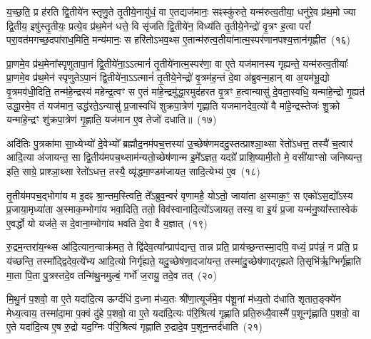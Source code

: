 य॒च्छ॒ति॒ प्र ह॑रति द्वि॒तीये॑न स्तृणु॒ते तृ॒तीये॒नायु॑धं॒ वा ए॒तद्यज॑मानः॒ सꣴस्कु॑रुते॒ यन्म॑रुत्व॒तीया॒ धनु॑रे॒व प्र॑थ॒मो ज्या द्वि॒तीय॒ इषु॑स्तृ॒तीयः॒ प्रत्ये॒व प्र॑थ॒मेन॑ धत्ते॒ वि सृ॑जति द्वि॒तीये॑न॒ विध्य॑ति तृ॒तीये॒नेन्द्रो॑ वृ॒त्रꣳ ह॒त्वा परां᳚ परा॒वत॑मगच्छ॒दपा॑राध॒मिति॒ मन्य॑मानः॒ स हरि॑तो\-ऽभव॒थ्स ए॒तान्म॑रुत्व॒तीया॑नात्म॒स्पर॑णानपश्य॒त्तान॑गृह्णीत~(१६)\ip

प्रा॒णमे॒व प्र॑थ॒मेना᳚स्पृणुतापा॒नं द्वि॒तीये॑ना॒\-ऽऽ\-त्मानं॑ तृ॒तीये॑नात्म॒स्पर॑णा॒ वा ए॒ते यज॑मानस्य गृह्यन्ते॒ यन्म॑रुत्व॒तीयाः᳚ प्रा॒णमे॒व प्र॑थ॒मेन॑ स्पृणुते\-ऽपा॒नं द्वि॒तीये॑ना॒\-ऽऽ\-त्मानं॑ तृ॒तीये॒नेन्द्रो॑ वृ॒त्रम॑ह॒न्तं दे॒वा अ॑ब्रुवन्म॒हान् वा अ॒यम॑भू॒द्यो वृ॒त्रमव॑धी॒दिति॒ तन्म॑हे॒न्द्रस्य॑ महेन्द्र॒त्वꣳ स ए॒तं मा॑हे॒न्द्रमु॑द्धा॒रमुद॑हरत वृ॒त्रꣳ ह॒त्वान्यासु॑ दे॒वता॒स्वधि॒ यन्मा॑हे॒न्द्रो गृ॒ह्यत॑ उद्धा॒रमे॒व तं यज॑मान॒ उद्ध॑रते॒\-ऽन्यासु॑ प्र॒जास्वधि॑ शुक्रपा॒त्रेण॑ गृह्णाति यजमानदेव॒त्यो॑ वै मा॑हे॒न्द्रस्तेजः॑ शु॒क्रो यन्मा॑हे॒न्द्रꣳ शु॑क्रपा॒त्रेण॑ गृ॒ह्णाति॒ यज॑मान ए॒व तेजो॑ दधाति॥~(१७)\ip

{\anuvakamend[{प्र॒थ॒मेना॑गृह्णीत दे॒वता᳚स्व॒ष्टाविꣳ॑शतिश्च}]}

अदि॑तिः पु॒त्रका॑मा सा॒ध्येभ्यो॑ दे॒वेभ्यो᳚ ब्रह्मौद॒नम॑पच॒त्तस्या॑ उ॒च्छेष॑णमददु॒स्तत्प्राश्ञा॒थ्सा रेतो॑\-ऽधत्त॒ तस्यै॑ च॒त्वार॑ आदि॒त्या अ॑जायन्त॒ सा द्वि॒तीय॑मपच॒थ्साम॑न्यतो॒च्छेष॑णान्म इ॒मे᳚\-ऽज्ञत॒ यदग्रे᳚ प्राशि॒ष्यामी॒तो मे॒ वसी॑याꣳसो जनिष्यन्त॒ इति॒ साग्रे॒ प्राश्ञा॒थ्सा रेतो॑\-ऽधत्त॒ तस्यै॒ व्यृ॑द्धमा॒ण्डम॑जायत॒ सादि॒त्येभ्य॑ ए॒व~(१८)\ip

तृ॒तीय॑मपच॒द्भोगा॑य म इ॒दꣴ श्रा॒न्तम॒स्त्विति॒ ते᳚\-ऽब्रुव॒न्वरं॑ वृणामहै॒ यो\-ऽतो॒ जाया॑ता अ॒स्माक॒ꣳ॒ स एको॑\-ऽस॒द्यो᳚\-ऽस्य प्र॒जाया॒मृध्या॑ता अ॒स्माक॒म्भोगा॑य भवा॒दिति॒ ततो॒ विव॑स्वानादि॒त्यो॑\-ऽजायत॒ तस्य॒ वा इ॒यं प्र॒जा यन्म॑नु॒ष्या᳚स्तास्वेक॑ ए॒वर्द्धो यो यज॑ते॒ स दे॒वाना॒म्भोगा॑य भवति दे॒वा वै य॒ज्ञात्~(१९)\ip

रु॒द्रम॒न्तरा॑य॒न्थ्स आ॑दि॒त्यान॒न्वाक्र॑मत॒ ते द्वि॑देव॒त्या᳚न्प्राप॑द्यन्त॒ तान्न प्रति॒ प्राय॑च्छ॒न्तस्मा॒दपि॒ वध्यं॒ प्रप॑न्नं॒ न प्रति॒ प्र य॑च्छन्ति॒ तस्मा᳚द्\-द्विदेव॒त्ये᳚भ्य आदि॒त्यो निर्गृ॑ह्यते॒ यदु॒च्छेष॑णा॒दजा॑यन्त॒ तस्मा॑दु॒च्छेष॑णाद्गृह्यते ति॒सृभि॑र्\mbox{}ऋ॒ग्भिर्गृ॑ह्णाति मा॒ता पि॒ता पु॒त्रस्तदे॒व तन्मि॑थु॒नमुल्बं॒ गर्भो॑ ज॒रायु॒ तदे॒व तत्~(२०)\ip

मि॒थु॒नं प॒शवो॒ वा ए॒ते यदा॑दि॒त्य ऊर्ग्दधि॑ द॒ध्ना म॑ध्य॒तः श्री॑णा॒त्यूर्ज॑मे॒व प॑शू॒नां म॑ध्य॒तो द॑धाति शृतात॒ङ्क्ये॑न मेध्य॒त्वाय॒ तस्मा॑दा॒मा प॒क्वं दु॑हे प॒शवो॒ वा ए॒ते यदा॑दि॒त्यः प॑रि॒श्रित्य॑ गृह्णाति प्रति॒रुध्यै॒वास्मै॑ प॒शून्गृ॑ह्णाति प॒शवो॒ वा ए॒ते यदा॑दि॒त्य ए॒ष रु॒द्रो यद॒ग्निः प॑रि॒श्रित्य॑ गृह्णाति रु॒द्रादे॒व प॒शून॒न्तर्द॑धाति~(२१)\ip


